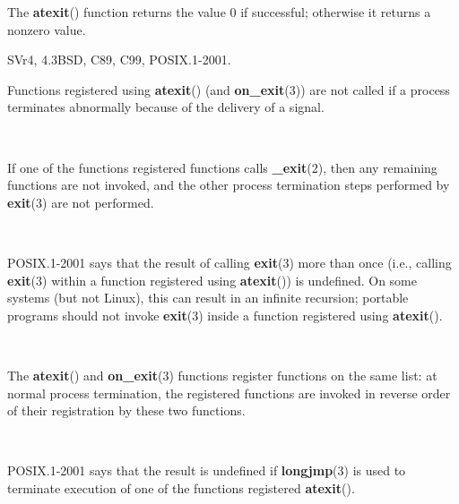 \documentclass[]{article}
\let\realtextbf=\textbf
\renewcommand{\textbf}[1]{\textcolor{boldcolor}{\realtextbf{#1}}}
\begin{document}

The \textbf{atexit}() function returns the value 0 if successful;
otherwise it returns a nonzero value.


SVr4, 4.3BSD, C89, C99, POSIX.1-2001.


Functions registered using \textbf{atexit}() (and \textbf{on\_exit}(3))
are not called if a process terminates abnormally because of the
delivery of a signal.

~

If one of the functions registered functions calls \textbf{\_exit}(2),
then any remaining functions are not invoked, and the other process
termination steps performed by \textbf{exit}(3) are not performed.

~

POSIX.1-2001 says that the result of calling \textbf{exit}(3) more than
once (i.e., calling \textbf{exit}(3) within a function registered using
\textbf{atexit}()) is undefined. On some systems (but not Linux), this
can result in an infinite recursion; portable programs should not invoke
\textbf{exit}(3) inside a function registered using \textbf{atexit}().

~

The \textbf{atexit}() and \textbf{on\_exit}(3) functions register
functions on the same list: at normal process termination, the
registered functions are invoked in reverse order of their registration
by these two functions.

~

POSIX.1-2001 says that the result is undefined if \textbf{longjmp}(3) is
used to terminate execution of one of the functions registered
\textbf{atexit}().

\end{document}
